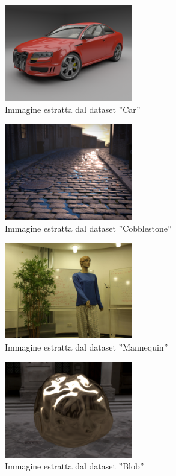 \begin{figure}[ht]
    \centering
    \includegraphics[width=0.5\textwidth]{img/Car.png}
    \caption{Immagine estratta dal dataset ”Car”}
    \label{fig:Car}
\end{figure}

\begin{figure}[ht]
    \centering
    \includegraphics[width=0.5\textwidth]{img/Cobblestone.png}
    \caption{Immagine estratta dal dataset ”Cobblestone”}
    \label{fig:Cobblestone}
\end{figure}

\begin{figure}[ht]
    \centering
    \includegraphics[width=0.5\textwidth]{img/Mannequin.png}
    \caption{Immagine estratta dal dataset ”Mannequin”}
    \label{fig:Mannequin}
\end{figure}

\begin{figure}[ht]
    \centering
    \includegraphics[width=0.5\textwidth]{img/Blob.png}
    \caption{Immagine estratta dal dataset ”Blob”}
    \label{fig:Blob}
\end{figure}
\clearpage
